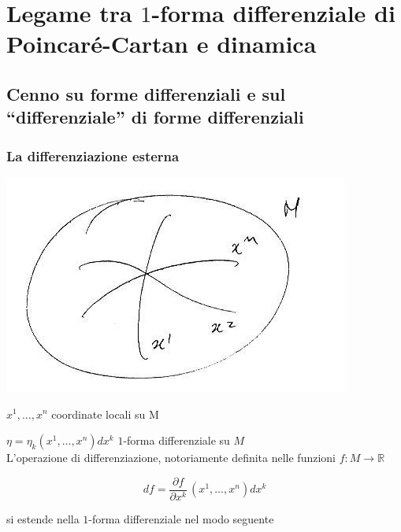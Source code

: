 \section{Legame tra $ 1 $-forma differenziale di Poincaré-Cartan e dinamica}
\setcounter{equation}{0}
\subsection{Cenno su forme differenziali e sul ``differenziale'' di forme differenziali}
\subsubsection*{La differenziazione esterna}

\begin{flushleft}
  \begin{minipage}[c]{.5\textwidth}
    \includegraphics[width=0.75\columnwidth]{media/legame-tra-1-forma-di-poincare-cartan-e-dinamica/11-1.jpg}
  \end{minipage}
  \begin{minipage}[c]{.49\textwidth}
    $x^1,...,x^n$ coordinate locali su M\\
  \end{minipage}
\end{flushleft}

$ \eta = \eta_k (x^1, \dots , x^n) dx^k $ $ 1 $-forma differenziale su $ M $ \\
L'operazione di differenziazione, notoriamente definita nelle funzioni $ f : M \rightarrow \mathbb{R} $

\begin{equation} \label{eq:poin_cart_1}
  df = \frac{\partial f}{\partial x^k} \, (x^1, \dots , x^n) dx^k
\end{equation}

si estende nella $ 1 $-forma differenziale nel modo seguente


